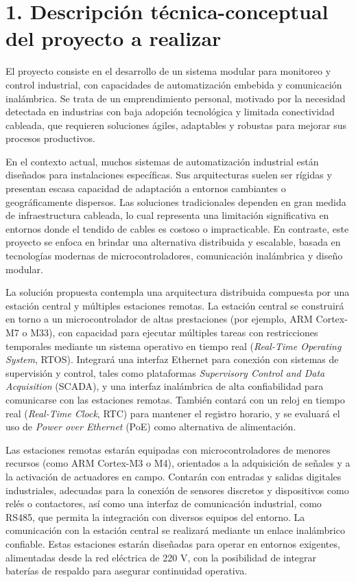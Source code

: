 \documentclass[
11pt, %
]{charter}
\begin{document}
\section{1. Descripción técnica-conceptual del proyecto a realizar}
\label{sec:descripcion}

El proyecto consiste en el desarrollo de un sistema modular para monitoreo y control industrial, con capacidades de automatización embebida y comunicación inalámbrica. Se trata de un emprendimiento personal, motivado por la necesidad detectada en industrias con baja adopción tecnológica y limitada conectividad cableada, que requieren soluciones ágiles, adaptables y robustas para mejorar sus procesos productivos.

En el contexto actual, muchos sistemas de automatización industrial están diseñados para instalaciones específicas. Sus arquitecturas suelen ser rígidas y presentan escasa capacidad de adaptación a entornos cambiantes o geográficamente dispersos. Las soluciones tradicionales dependen en gran medida de infraestructura cableada, lo cual representa una limitación significativa en entornos donde el tendido de cables es costoso o impracticable. En contraste, este proyecto se enfoca en brindar una alternativa distribuida y escalable, basada en tecnologías modernas de microcontroladores, comunicación inalámbrica y diseño modular.

La solución propuesta contempla una arquitectura distribuida compuesta por una estación central y múltiples estaciones remotas. La estación central se construirá en torno a un microcontrolador de altas prestaciones (por ejemplo, ARM Cortex-M7 o M33), con capacidad para ejecutar múltiples tareas con restricciones temporales mediante un sistema operativo en tiempo real (\textit{Real-Time Operating System}, RTOS). Integrará una interfaz Ethernet para conexión con sistemas de supervisión y control, tales como plataformas \textit{Supervisory Control and Data Acquisition} (SCADA), y una interfaz inalámbrica de alta confiabilidad para comunicarse con las estaciones remotas. También contará con un reloj en tiempo real (\textit{Real-Time Clock}, RTC) para mantener el registro horario, y se evaluará el uso de \textit{Power over Ethernet} (PoE) como alternativa de alimentación.

Las estaciones remotas estarán equipadas con microcontroladores de menores recursos (como ARM Cortex-M3 o M4), orientados a la adquisición de señales y a la activación de actuadores en campo. Contarán con entradas y salidas digitales industriales, adecuadas para la conexión de sensores discretos y dispositivos como relés o contactores, así como una interfaz de comunicación industrial, como RS485, que permita la integración con diversos equipos del entorno. La comunicación con la estación central se realizará mediante un enlace inalámbrico confiable. Estas estaciones estarán diseñadas para operar en entornos exigentes, alimentadas desde la red eléctrica de 220 V, con la posibilidad de integrar baterías de respaldo para asegurar continuidad operativa.
\end{document}
